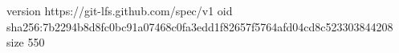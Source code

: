 version https://git-lfs.github.com/spec/v1
oid sha256:7b2294b8d8fc0bc91a07468c0fa3edd1f82657f5764afd04cd8c523303844208
size 550
